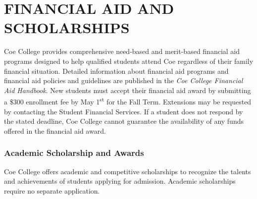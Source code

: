 \documentclass[
  letterpaper,
]{scrbook}
\begin{document}
\chapter{FINANCIAL AID AND
SCHOLARSHIPS}\label{financial-aid-and-scholarships}

Coe College provides comprehensive need-based and merit-based financial
aid programs designed to help qualified students attend Coe regardless
of their family financial situation. Detailed information about
financial aid programs and financial aid policies and guidelines are
published in the \emph{Coe College Financial Aid Handbook}. New students
must accept their financial aid award by submitting a \$300 enrollment
fee by May 1\textsuperscript{st} for the Fall Term. Extensions may be
requested by contacting the Student Financial Services. If a student
does not respond by the stated deadline, Coe College cannot guarantee
the availability of any funds offered in the financial aid award.

\subsection{Academic Scholarship and
Awards}\label{academic-scholarship-and-awards}

Coe College offers academic and competitive scholarships to recognize
the talents and achievements of students applying for admission.
Academic scholarships require no separate application.
\end{document}
